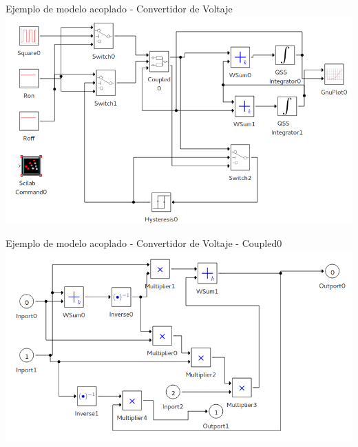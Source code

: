 \documentclass{beamer}
\begin{document}
\begin{frame}[fragile]{Ejemplo de modelo acoplado - Convertidor de Voltaje}
        \includegraphics[width=\linewidth]{buck_disk}
\end{frame}

\begin{frame}{Ejemplo de modelo acoplado - Convertidor de Voltaje - Coupled0}
        \includegraphics[width=\linewidth]{buck_disk_coupled0}
\end{frame}
\end{document}
